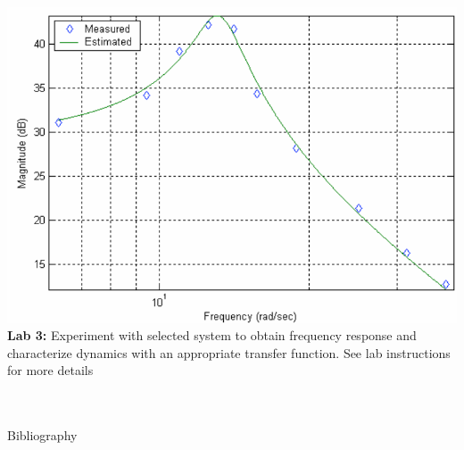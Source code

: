 \documentclass[aspectratio=169]{beamer}
\begin{document}
\begin{frame}
\begin{columns}
\begin{column}{0.5\textwidth}
			\includegraphics[width=\textwidth]{Images/sys_char_bode_data.png}
			\footnotesize{
				\textbf{Lab 3:}
				Experiment with selected system to obtain frequency response and characterize dynamics with an appropriate transfer function.
				\tiny{See lab instructions for more details}
				}
		\end{column}
	\end{columns}
\end{frame}

\section*{}
\begin{frame}[allowframebreaks]{Bibliography}
	
	
\end{frame}
\end{document}
